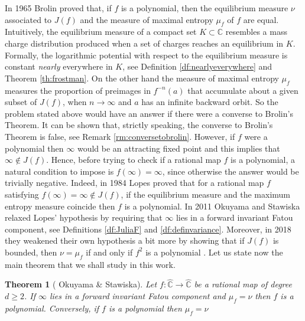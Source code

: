 \documentclass[12pt,letterpaper,twoside]{book}
\newcommand{\C}{\widehat{\mathbb{C}}}
\newtheorem{theo}{Theorem}[section]
\theoremstyle{definition}
\begin{document}
In 1965 Brolin \cite{brolin1965invariant} proved that, if $f$ is a polynomial, then the equilibrium measure $\nu$ associated to $J(f)$ and the measure  of maximal entropy $\mu_f$ of $f$ are equal. Intuitively, the equilibrium measure of a compact set $K\subset \mathbb{C}$ resembles a mass charge distribution produced when a set of charges reaches an equilibrium in $K$. Formally, the logarithmic potential with respect to the equilibrium measure is constant {\it nearly} everywhere in $K$, see Definition \ref{df:nearlyeverywhere} and Theorem \ref{th:frostman}. On the other hand the measure of maximal entropy $\mu_f$ measures the proportion of preimages in $f^{-n}(a)$ that accumulate about a given subset of $J(f)$, when $n\rightarrow \infty$ and $a$ has an infinite backward orbit. So the problem stated above would have an answer if there were a converse to Brolin's Theorem. It can be shown that, strictly speaking, the converse to Brolin's Theorem is false, see Remark \ref{rm:conversetobrolin}. However, if $f$ were a polynomial then $\infty$ would be an attracting fixed point and this implies that $\infty\not \in J(f)$. Hence, before trying to check if a rational map $f$ is a polynomial, a natural condition to impose is $f(\infty)=\infty$, since otherwise the answer would be trivially negative. Indeed, in 1984 Lopes \cite{lopes} proved that for a rational map $f$ satisfying $f(\infty)=\infty\not \in J(f)$, if the equilibrium measure and the maximum entropy measure coincide then $f$ is a polynomial. In 2011 Okuyama and Stawiska \cite{okuyama} relaxed Lopes' hypothesis by requiring that $\infty$ lies in a forward invariant Fatou component, see Definitions \ref{df:JuliaF} and \ref{df:definvariance}. Moreover, in 2018 they weakened their own hypothesis a bit more by showing that if $J(f)$ is bounded, then $\nu=\mu_f$ if and only if $f^2$ is a polynomial \cite{okuyama2018}. Let us state now the main theorem that we shall study in this work.

\begin{theo}[ Okuyama \& Stawiska]\label{theo:Oku}
Let $f:\C \rightarrow \C$ be a rational map of degree $d\geq 2$. If $\infty$ lies in a forward invariant Fatou component and $\mu_f=\nu$ then $f$ is a polynomial. Conversely, if $f$ is a polynomial then $\mu_f=\nu$
\end{theo}
\end{document}
